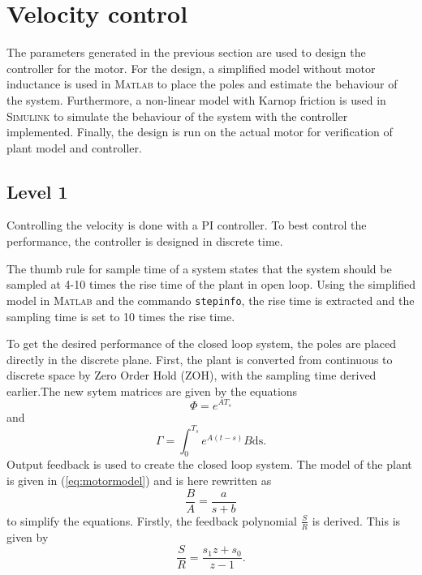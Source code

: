 \documentclass[12pt,a4paper]{article}
\begin{document}
\section*{Velocity control}
\label{sec:velocity_control}
The parameters generated in the previous section are used to design the
controller for the motor. For the design, a simplified model without motor
inductance is used in \textsc{Matlab} to place the poles and estimate the
behaviour of the system. Furthermore, a non-linear model with Karnop friction is
used in \textsc{Simulink} to simulate the behaviour of the system with the
controller implemented. Finally, the design is run on the actual motor for
verification of plant model and controller.
\subsection*{Level 1}
\label{sub:velocity_level_1}
Controlling the velocity is done with a PI controller. To best control the
performance, the controller is designed in discrete time. \par
The thumb rule for sample time of a system states that the system should be
sampled at 4-10 times the rise time of the plant in open loop. Using the
simplified model in \textsc{Matlab} and the commando \texttt{stepinfo}, the rise
time is extracted and the sampling time is set to 10 times the rise time. \par
To get the desired performance of the closed loop system, the poles are placed
directly in the discrete plane. First, the plant is converted from continuous to
discrete space by Zero Order Hold (ZOH), with the sampling time derived
earlier.The new sytem matrices are given by the equations
\begin{equation}
    \label{eq:phi}
    \Phi = e^{AT_s}
\end{equation}
and 
\begin{equation}
    \label{eq:gamma}
    \Gamma = \int_0^{T_s}{e^{A(t-s)}B\text{ds}}.
\end{equation}
Output feedback is used to create the closed loop system. 
The model of the plant is given in (\ref{eq:motormodel}) and is here rewritten as
\begin{equation}
    \label{eq:motorsimple}
    \frac{B}{A}=\frac{a}{s + b}
\end{equation}
to simplify the equations. 
Firstly, the feedback polynomial $\frac{S}{R}$ is derived. This is given by
\begin{equation}
    \label{eq:feedback_vel}
    \frac{S}{R}=\frac{s_1z + s_0}{z - 1}.
\end{equation}
\end{document}
